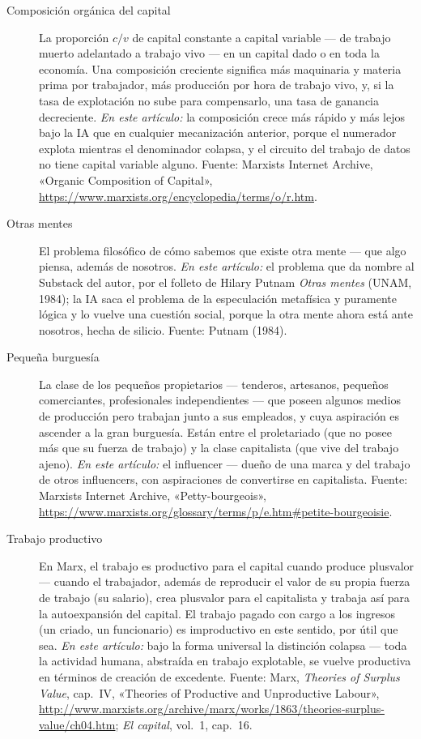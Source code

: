 \documentclass[11pt]{article}
\begin{document}
\begin{description}
\item[Composición orgánica del capital] La proporción $c/v$ de capital
constante a capital variable --- de trabajo muerto adelantado a trabajo
vivo --- en un capital dado o en toda la economía. Una composición
creciente significa más maquinaria y materia prima por trabajador, más
producción por hora de trabajo vivo, y, si la tasa de explotación no
sube para compensarlo, una tasa de ganancia decreciente. \emph{En este
artículo:} la composición crece más rápido y más lejos bajo la IA que
en cualquier mecanización anterior, porque el numerador explota mientras
el denominador colapsa, y el circuito del trabajo de datos no tiene
capital variable alguno. Fuente: Marxists Internet Archive, «Organic
Composition of Capital»,
\url{https://www.marxists.org/encyclopedia/terms/o/r.htm}.

\item[Otras mentes] El problema filosófico de cómo sabemos que existe
otra mente --- que algo piensa, además de nosotros. \emph{En este
artículo:} el problema que da nombre al Substack del autor, por el
folleto de Hilary Putnam \textit{Otras mentes} (UNAM, 1984); la IA
saca el problema de la especulación metafísica y puramente lógica y lo
vuelve una cuestión social, porque la otra mente ahora está ante
nosotros, hecha de silicio. Fuente: Putnam (1984).

\item[Pequeña burguesía] La clase de los pequeños propietarios ---
tenderos, artesanos, pequeños comerciantes, profesionales
independientes --- que poseen algunos medios de producción pero trabajan
junto a sus empleados, y cuya aspiración es ascender a la gran
burguesía. Están entre el proletariado (que no posee más que su fuerza
de trabajo) y la clase capitalista (que vive del trabajo ajeno).
\emph{En este artículo:} el influencer --- dueño de una marca y del
trabajo de otros influencers, con aspiraciones de convertirse en
capitalista. Fuente: Marxists Internet Archive, «Petty-bourgeois»,
\url{https://www.marxists.org/glossary/terms/p/e.htm#petite-bourgeoisie}.

\item[Trabajo productivo] En Marx, el trabajo es productivo para el
capital cuando produce plusvalor --- cuando el trabajador, además de
reproducir el valor de su propia fuerza de trabajo (su salario), crea
plusvalor para el capitalista y trabaja así para la autoexpansión del
capital. El trabajo pagado con cargo a los ingresos (un criado, un
funcionario) es improductivo en este sentido, por útil que sea.
\emph{En este artículo:} bajo la forma universal la distinción colapsa
--- toda la actividad humana, abstraída en trabajo explotable, se vuelve
productiva en términos de creación de excedente. Fuente: Marx,
\textit{Theories of Surplus Value}, cap.~IV, «Theories of Productive
and Unproductive Labour»,
\url{http://www.marxists.org/archive/marx/works/1863/theories-surplus-value/ch04.htm};
\textit{El capital}, vol.~1, cap.~16.


\end{description}
\end{document}
